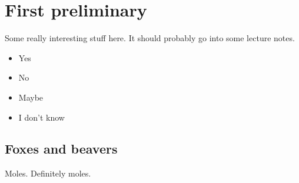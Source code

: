 \mode*

\section{First preliminary}

\begin{frame}
Some really interesting stuff here. It should probably go into some lecture notes.
\end{frame}

\begin{itemize}
\item Yes
\item No
\item Maybe
\item I don't know
\end{itemize}

\subsection{Foxes and beavers}

Moles. Definitely moles.
